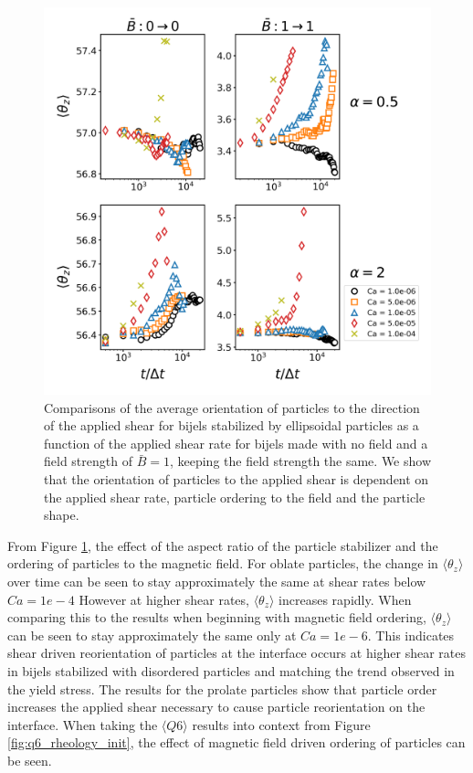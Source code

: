 \begin{figure} 
    \centering 
    \includegraphics[scale=0.5]{../figures/results/paper3/theta_z-time_compare-specific.png} 
    \caption{Comparisons of the average orientation of particles to the direction of the applied shear for bijels stabilized by
             ellipsoidal particles as a function of the applied shear rate for bijels made with no field and a field strength of $\bar{B} = 1$,
             keeping the field strength the same. We show that the orientation of particles to the applied shear is dependent on the
             applied shear rate, particle ordering to the field and the particle shape.} 
    \label{fig:theta_z_specific} 
\end{figure}

From Figure \ref{fig:theta_z_specific}, the effect of the aspect ratio of the particle stabilizer and the ordering of particles to the magnetic field. For oblate 
particles, the change in $\langle \theta_z \rangle$ over time can be seen to stay approximately the same at shear rates below $Ca = 1e-4$ However at higher shear rates,
$\langle \theta_z \rangle$ increases rapidly. When comparing this to the results when beginning with magnetic field ordering, $\langle \theta_z \rangle$ can be seen to
stay approximately the same only at $Ca = 1e-6$. This indicates shear driven reorientation of particles at the interface occurs at higher shear rates in bijels stabilized
with disordered particles and matching the trend observed in the yield stress. The results for the prolate particles show that particle order increases the applied shear
necessary to cause particle reorientation on the interface. When taking the $\langle Q6 \rangle$ results into context from Figure \ref{fig:q6_rheology_init}, 
the effect of magnetic field driven ordering of particles can be seen.

